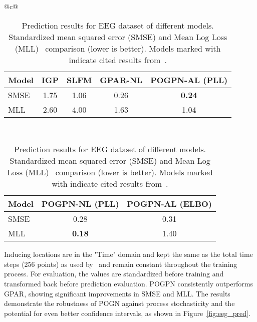 \begin{table}[h]
      \setlength{\tabcolsep}{4pt}
      \centering
      \begin{tabular}{@{}c@{}}
            \begin{tabular}{@{\hskip 0pt}lcccc@{\hskip 0pt}}
                  \toprule
                  Model & IGP\textsuperscript{\textdagger} & SLFM\textsuperscript{\textdagger} & GPAR-NL\textsuperscript{\textdagger} & POGPN-AL (PLL) \\
                  \midrule
                  SMSE  &
                  1.75  &
                  1.06  &
                  0.26  &
                  \textbf{0.24}
                  \\
                  MLL   &
                  2.60  & 4.00                             & 1.63                              & 1.04
                  \\
                  \bottomrule
            \end{tabular}
            \\[2em] %

            \begin{tabular}{@{\hskip 0pt}lcc@{\hskip 0pt}}
                  \toprule
                  Model & POGPN-NL (PLL) & POGPN-AL (ELBO) \\
                  \midrule
                  SMSE  & 0.28           & 0.31            \\
                  MLL   & \textbf{0.18}  & 1.40            \\
                  \bottomrule
            \end{tabular}
      \end{tabular}
      \caption{Prediction results for EEG dataset of different models. Standardized mean squared error (SMSE) and Mean Log Loss (MLL)~\cite{rasmussen2003gaussian} comparison (lower is better). Models marked with \textsuperscript{\textdagger} indicate cited results from~\cite{requeima2019gaussian}.}
      \vspace{-1em}
\end{table}
Inducing locations are in the "Time" domain and kept the same as the total time steps (256 points) as used by~\cite{requeima2019gaussian} and remain constant throughout the training process. For evaluation, the values are standardized before training and transformed back before prediction evaluation. POGPN consistently outperforms GPAR, showing significant improvements in SMSE and MLL. The results demonstrate the robustness of POGN against process stochasticity and the potential for even better confidence intervals, as shown in Figure~\ref{fig:eeg_pred}.

